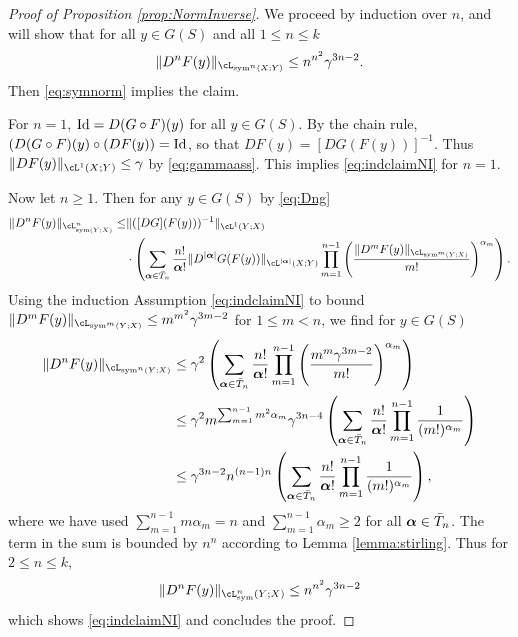 \begin{proof}[Proof of Proposition \ref{prop:NormInverse}]
    We proceed by induction over $n$, and will show that for all
    $y\in G(S)$ and all $1\le n\le k$
   \begin{equation}\label{eq:indclaimNI}
      \|D^n F(y)\|_{\cL_{\sym^n(X;Y)}}\le n^{n^2}\gamma^{3n-2}.
    \end{equation}
    Then \eqref{eq:symnorm} implies the claim.

    For $n=1$,
    ${\rm Id} = D(G\circ F)(y)$ for all $y \in G(S)$. By the chain
    rule, $(D(G\circ F)(y)\circ (DF(y)) = {\rm Id}$, so that
    $DF(y) = [DG (F(y))]^{-1}$. Thus $\|DF(y)\|_{\cL^1(X;Y)}\le \gamma$ by
    \eqref{eq:gammaass}. This implies \eqref{eq:indclaimNI} for
    $n=1$.

    Now let $n \ge 1$. Then for any $y\in G(S)$ by \eqref{eq:Dng}
\begin{align*}
\|D^nF(y)\|_{\cL^n_{\sym(Y;X)}} \le &\|([DG](F(y)))^{-1}\|_{\cL^1(Y;X)}\\ &\cdot \left ( \sum_{\bsalpha\in \bar{T}_n}\frac{n!}{\bsalpha!}\|D^{|\bsalpha|}G(F(y))\|_{\cL^{|\bsalpha|}(X;Y)} \prod_{m=1}^{n-1} \left (\frac{\|D^m F(y)\|_{\cL_{\sym^m(Y;X)}}}{m!} \right )^{\alpha_m}\right).
\end{align*}
Using the induction Assumption \eqref{eq:indclaimNI} to bound
$\|D^mF(y)\|_{\cL_{\sym^m(Y;X)}}\le m^{m^2}\gamma^{3m-2}$ for $1\le m<n$, we
find for $y\in G(S)$
\begin{align*}
  \|D^nF(y)\|_{\cL_{\sym^n(Y;X)}} &\le \gamma^2 \left ( \sum_{\bsalpha\in
                           \bar{T}_n}\frac{n!}{\bsalpha!} \prod_{m=1}^{n-1} \left (\frac{m^{m}\gamma^{3m-2}}{m!} \right )^{\alpha_m}\right)\nonumber\\
                                &\le \gamma^2
                                  m^{\sum_{m=1}^{n-1}m^2\alpha_m}\gamma^{3n-4}
\left ( \sum_{\bsalpha\in
                           \bar{T}_n}\frac{n!}{\bsalpha!} \prod_{m=1}^{n-1}\frac{1}{(m!)^{\alpha_m}} \right)\\
                           &\le \gamma^{3n-2}n^{(n-1)n}\left ( \sum_{\bsalpha\in
                           \bar{T}_n}\frac{n!}{\bsalpha!} \prod_{m=1}^{n-1}\frac{1}{(m!)^{\alpha_m}} \right) ,
\end{align*}
where we have used $\sum_{m=1}^{n-1}m\alpha_m=n$ and
$\sum_{m=1}^{n-1} \alpha_m\ge 2$ for all ${\boldsymbol \alpha}\in \bar T_n$. The
term in the sum is bounded by $n^n$ according to Lemma
\ref{lemma:stirling}.  Thus for $2\le n\le k$,
\begin{equation*}
  \|D^nF(y)\|_{\cL_{\sym}^n(Y;X)}\le n^{n^2}\gamma^{3n-2}
\end{equation*}
which shows \eqref{eq:indclaimNI} and concludes the proof.
\end{proof}
